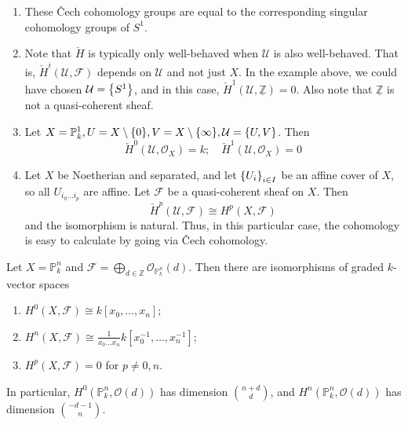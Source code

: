 \begin{remark}
	\begin{enumerate}
		\item These \v{C}ech cohomology groups are equal to the corresponding singular cohomology groups of \( S^1 \).
		\item Note that \( \check{H} \) is typically only well-behaved when \( \mathcal U \) is also well-behaved.
		That is, \( \check{H}^i(\mathcal U, \mathcal F) \) depends on \( \mathcal U \) and not just \( X \).
		In the example above, we could have chosen \( \mathcal U = \qty{S^1} \), and in this case, \( \check{H}^1(\mathcal U, \underline{\mathbb Z}) = 0 \).
		Also note that \( \underline{\mathbb Z} \) is not a quasi-coherent sheaf.
		\item Let \( X = \mathbb P^1_k, U = X \setminus \qty{0}, V = X \setminus \qty{\infty}, \mathcal U = \qty{U, V} \).
		Then
		\[ \check{H}^0(\mathcal U, \mathcal O_X) = k;\quad \check{H}^1(\mathcal U, \mathcal O_X) = 0 \]
		\item Let \( X \) be Noetherian and separated, and let \( \qty{U_i}_{i \in I} \) be an affine cover of \( X \), so all \( U_{i_0 \dots i_p} \) are affine.
		Let \( \mathcal F \) be a quasi-coherent sheaf on \( X \).
		Then
		\[ \check{H}^p(\mathcal U, \mathcal F) \cong H^p(X, \mathcal F) \]
		and the isomorphism is natural.
		Thus, in this particular case, the cohomology is easy to calculate by going via \v{C}ech cohomology.
	\end{enumerate}
\end{remark}
\begin{theorem}
	Let \( X = \mathbb P^n_k \) and \( \mathcal F = \bigoplus_{d \in \mathbb Z} \mathcal O_{\mathbb P^n_k}(d) \).
	Then there are isomorphisms of graded \( k \)-vector spaces
	\begin{enumerate}
		\item \( H^0(X, \mathcal F) \cong k[x_0, \dots, x_n] \);
		\item \( H^n(X, \mathcal F) \cong \frac{1}{x_0 \dots x_n} k[x_0^{-1}, \dots, x_n^{-1}] \);
		\item \( H^p(X, \mathcal F) = 0 \) for \( p \neq 0, n \).
	\end{enumerate}
	In particular, \( H^0(\mathbb P^n_k, \mathcal O(d)) \) has dimension \( \binom{n+d}{d} \), and \( H^n(\mathbb P^n_k, \mathcal O(d)) \) has dimension \( \binom{-d-1}{n} \).
\end{theorem}
